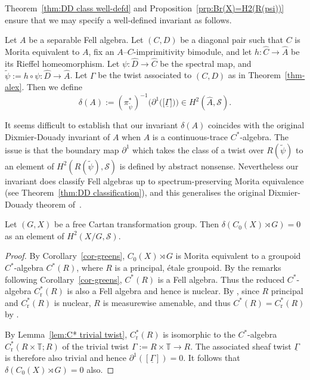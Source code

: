 \documentclass[12pt,a4paper]{amsart}
\newcommand{\field}[1]{\mathbb{#1}}
\newcommand{\TT}{\field{T}}
\newcommand{\red}{\operatorname{r}}
\newcommand{\Tgerms}{\mathcal{S}}
\newcommand{\tgcsa}[2]{\ensuremath{C^*_{\red}(#1 ; #2)}}
\begin{document}
Theorem~\ref{thm:DD class well-defd} and
Proposition~\ref{prp:Br(X)=H2(R(psi))} ensure that we may
specify a well-defined invariant as follows.

\begin{defn}\label{dfn:DD invariant}
Let $A$ be a separable Fell algebra. Let $(C,D)$ be a diagonal
pair such that $C$ is Morita equivalent to $A$, fix an
$A$--$C$-imprimitivity bimodule, and let $h : \widehat{C} \to
\widehat{A}$ be its Rieffel homeomorphism. Let $\psi :
\widehat{D} \to \widehat{C}$ be the spectral map, and
$\tilde\psi := h \circ \psi : \widehat{D} \to \widehat{A}$. Let
$\Gamma$ be the twist associated to $(C,D)$ as in
Theorem~\ref{thm-alex}. Then we define
\[
\delta(A) := (\pi^*_{\tilde\psi})^{-1}\big(\partial^1\big(\!\big[\underline{\Gamma}\big]\!\big)\big) \in H^2(\widehat{A}, \Tgerms).
\]
\end{defn}

\begin{remark}\label{rmk:why not DD invariant}
It seems difficult to establish that our invariant $\delta(A)$
coincides with the original Dixmier-Douady invariant of $A$
when $A$ is a continuous-trace $C^*$-algebra. The issue is that
the boundary map $\partial^1$ which takes the class of a twist
over $R(\tilde\psi)$ to an element of
$H^2(R(\tilde\psi),\Tgerms)$ is defined by abstract nonsense.
Nevertheless our invariant does classify Fell algebras up to
spectrum-preserving Morita equivalence (see Theorem~\ref{thm:DD
classification}), and this generalises the original
Dixmier-Douady theorem of~\cite{DD}.
\end{remark}

\begin{prop}
Let $(G,X)$ be a free Cartan transformation group. Then
$\delta(C_0(X) \rtimes G) = 0$ as an element of $H^2(X/G,
\Tgerms)$.
\end{prop}

\begin{proof}
By Corollary~\ref{cor-greens}, $C_0(X)\rtimes G$ is Morita
equivalent to a  groupoid $C^*$-algebra $C^*(R)$, where $R$ is
a principal, \'etale groupoid. By the remarks following
Corollary~\ref{cor-greens}, $C^*(R)$ is a Fell algebra. Thus
the reduced $C^*$-algebra $C^*_{\red}(R)$ is also a Fell
algebra and hence is nuclear. By \cite[Corollary~6.2.14]{ADR},
since $R$ principal and $C^*_{\red}(R)$ is nuclear, $R$ is
measurewise amenable, and thus $C^*(R)=C^*_{\red}(R)$ by
\cite[Proposition~6.1.8]{ADR}.

By Lemma~\ref{lem:C* trivial twist}, $C^*_{\red}(R)$ is
isomorphic to the $C^*$-algebra  $\tgcsa{R \times \TT}{R}$ of the trivial twist $\Gamma:=R\times\TT\to R$. The associated sheaf
twist $\underline{\Gamma}$ is therefore also trivial and hence
$\partial^1([\underline{\Gamma}])=0$. It follows that
$\delta(C_0(X) \rtimes G) = 0$ also.
\end{proof}
\end{document}

